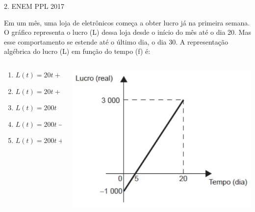 \documentclass[11pt]{beamer}
\begin{document}
\begin{frame}{2. ENEM PPL 2017}

    Em um mês, uma loja de eletrônicos começa a obter lucro já na primeira semana. O gráfico representa o lucro (L) dessa loja desde o início do mês até o dia 20. Mas esse comportamento se estende até o último dia, o dia 30. A representação algébrica do lucro (L) em função do tempo (f) é:

    \begin{columns}
        \begin{column}{0.4\textwidth}
            \begin{enumerate}[a]
                \item $L(t) = 20t+ 3 000$ 
                \item $L(t) = 20t+ 4 000$
                \item $L(t) = 200t$
                \item $L(t) = 200t-1 000$ %
                \item $L(t) = 200t+ 3 000$
            \end{enumerate}
        \end{column}

        \begin{column}{0.5\textwidth}
            \centering
            \includegraphics[scale=0.4]{imagens/q1.png}
        \end{column}
    \end{columns}

\end{frame}
\end{document}

